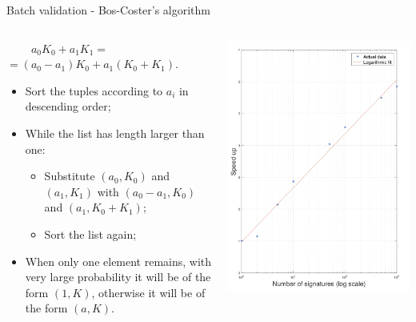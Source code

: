 \documentclass[slidescentered]{beamer}
\newcommand{\backupend}{
	\addtocounter{framenumberappendix}{-\value{framenumber}}
	\addtocounter{framenumber}{\value{framenumberappendix}} 
}
\begin{document}
	\begin{frame}{Batch validation - Bos-Coster's algorithm}
		\begin{columns}
			\begin{column}{0.5\linewidth}
				$\ \ \ \ \ \ \ \ \ \ a_0K_0 + a_1K_1 =$ \\ $= (a_0 - a_1)K_0 + a_1(K_0 + K_1)$.
				
				\bigskip
				
				\begin{itemize}
					\item Sort the tuples according to $a_i$ in descending order;
					\item While the list has length larger than one:
					\begin{itemize}
						\item Substitute $(a_0, K_0)$ and $(a_1, K_1)$ with $(a_0 - a_1, K_0)$ and $(a_1, K_0 + K_1)$;
						\item Sort the list again;
					\end{itemize}
					\item When only one element remains, with very large probability it will be of the form $(1, K)$, otherwise it will be of the form $(a, K)$.
				\end{itemize}
			\end{column}
			\begin{column}{0.5\linewidth}
				\hspace*{0cm}
				\includegraphics[scale=0.3]{images/speedup}
			\end{column}
		\end{columns}
	\end{frame}
	\backupend
\end{document}
